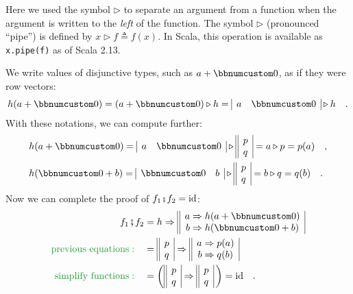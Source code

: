 Here we used the symbol $\triangleright$ to separate an argument
from a function when the argument is written to the \emph{left} of
the function. The symbol $\triangleright$ (pronounced ``pipe'')
is defined by $x\triangleright f\triangleq f(x)$. In Scala, this
operation is available as \lstinline!x.pipe(f)! as of Scala 2.13.

We write values of disjunctive types, such as $a+\bbnum 0$, as if
they were row vectors:
\begin{equation}
h(a+\bbnum 0)=(a+\bbnum 0)\triangleright h=\begin{array}{|cc|}
a & \bbnum 0\end{array}\triangleright h\quad.\label{eq:forward-notation-}
\end{equation}
With these notations, we can compute further:
\begin{align*}
 & h(a+\bbnum 0)=\begin{array}{|cc|}
a & \bbnum 0\end{array}\triangleright\begin{array}{||c|}
p\\
q
\end{array}=a\triangleright p=p(a)\quad,\\
 & h(\bbnum 0+b)=\begin{array}{|cc|}
\bbnum 0 & b\end{array}\triangleright\begin{array}{||c|}
p\\
q
\end{array}=b\triangleright q=q(b)\quad.
\end{align*}
Now we can complete the proof of $f_{1}\bef f_{2}=\text{id}$:
\begin{align*}
f_{1}\bef f_{2} & =h\Rightarrow\begin{array}{||c|}
a\Rightarrow h(a+\bbnum 0)\\
b\Rightarrow h(\bbnum 0+b)
\end{array}\\
{\color{greenunder}\text{previous equations}:}\quad & =\begin{array}{||c|}
p\\
q
\end{array}\Rightarrow\begin{array}{||c|}
a\Rightarrow p(a)\\
b\Rightarrow q(b)
\end{array}\\
{\color{greenunder}\text{simplify functions}:}\quad & =\bigg(\begin{array}{||c|}
p\\
q
\end{array}\Rightarrow\begin{array}{||c|}
p\\
q
\end{array}\,\bigg)=\text{id}\quad.
\end{align*}

